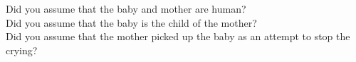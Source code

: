 Did you assume that the baby and mother are human?\\
Did you assume that the baby is the child of the mother?\\
Did you assume that the mother picked up the baby as an attempt to stop the crying?
